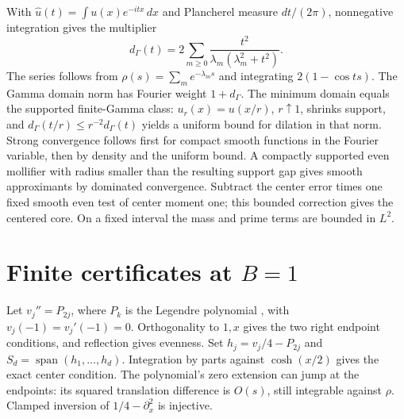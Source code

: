 \documentclass[11pt,a4paper]{article}
\numberwithin{equation}{section}
\theoremstyle{definition}\newtheorem{definition}[theorem]{Definition}
\theoremstyle{remark}\newtheorem{remark}[theorem]{Remark}
\begin{document}
With $\widehat u(t)=\int u(x)e^{-itx}\,dx$ and Plancherel measure $dt/(2\pi)$, nonnegative integration gives the multiplier
\[
 d_\Gamma(t)=2\sum_{m\ge0}\frac{t^2}{\lambda_m(\lambda_m^2+t^2)}.
\]
The series follows from $\rho(s)=\sum_m e^{-\lambda_ms}$ and integrating $2(1-\cos ts)$. The Gamma domain norm has Fourier weight $1+d_\Gamma$. The minimum domain equals the supported finite-Gamma class: $u_r(x)=u(x/r)$, $r\uparrow1$, shrinks support, and $d_\Gamma(t/r)\le r^{-2}d_\Gamma(t)$ yields a uniform bound for dilation in that norm. Strong convergence follows first for compact smooth functions in the Fourier variable, then by density and the uniform bound. A compactly supported even mollifier with radius smaller than the resulting support gap gives smooth approximants by dominated convergence. Subtract the center error times one fixed smooth even test of center moment one; this bounded correction gives the centered core. On a fixed interval the mass and prime terms are bounded in $L^2$.

\section[Finite certificates at B=1]{Finite certificates at $B=1$}\label{vsix:finite}
Let $v_j''=P_{2j}$, where $P_k$ is the Legendre polynomial \cite{vsixDLMFLegendre}, with $v_j(-1)=v_j'(-1)=0$. Orthogonality to $1,x$ gives the two right endpoint conditions, and reflection gives evenness. Set $h_j=v_j/4-P_{2j}$ and $S_d=\operatorname{span}(h_1,\ldots,h_d)$. Integration by parts against $\cosh(x/2)$ gives the exact center condition. The polynomial's zero extension can jump at the endpoints: its squared translation difference is $O(s)$, still integrable against $\rho$. Clamped inversion of $1/4-\partial_x^2$ is injective.
\end{document}
